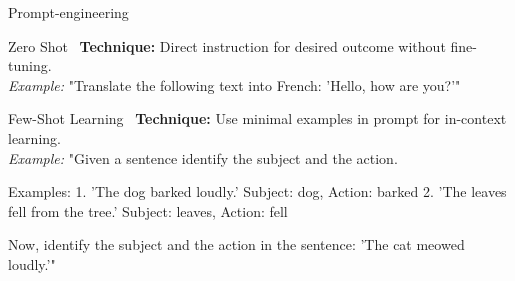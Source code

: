 \documentclass[presentation, 10pt]{beamer}\mode<presentation>{\usetheme{AMSBolognaFC}}
\begin{document}
\begin{frame}[allowframebreaks]{Prompt-engineering}
\begin{exampleblock}{Zero Shot~\cite{DBLP:conf/iclr/WeiBZGYLDDL22}}
	\textbf{Technique:} Direct instruction for desired outcome without fine-tuning. \\
	\emph{Example:} "Translate the following text into French: 'Hello, how are you?'"
\end{exampleblock}
\begin{exampleblock}{Few-Shot Learning~\cite{DBLP:conf/nips/BrownMRSKDNSSAA20}}
	\textbf{Technique:} Use minimal examples in prompt for in-context learning. \\
	\emph{Example:} "Given a sentence identify the subject and the action.

	Examples:
	1. ’The dog barked loudly.’ Subject: dog, Action: barked
	2. ’The leaves fell from the tree.’ Subject: leaves, Action: fell
	
	Now, identify the subject and the action in the sentence: ’The cat meowed loudly.’"
\end{exampleblock}


\end{frame}
\end{document}
